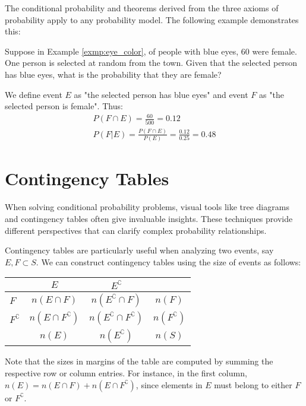 The conditional probability and theorems derived from the three axioms of probability apply to any probability model.
The following example demonstrates this:

\begin{exmp}
	Suppose in Example \autoref{exmp:eye_color}, of people with blue eyes, 60 were female.
	One person is selected at random from the town.
	Given that the selected person has blue eyes, what is the probability that they are female?
\end{exmp}
\begin{solution}
	We define event \( E \) as "the selected person has blue eyes" and event \( F \) as "the selected person is female".
	Thus:
	\begin{gather*}
		P(F \cap E) = \frac{60}{500} = 0.12\\
		P(F | E) = \frac{P(F \cap E)}{P(E)} = \frac{0.12}{0.25} = 0.48
	\end{gather*}
\end{solution}

\section{Contingency Tables}

When solving conditional probability problems, visual tools like tree diagrams and contingency tables often give invaluable insights.
These techniques provide different perspectives that can clarify complex probability relationships.

Contingency tables are particularly useful when analyzing two events, say \( E, F \subset S \).
We can construct contingency tables using the size of events as follows:
\begin{center}
\begin{tabular}{l|cc|c}
                       & \( E \) & \( E^\complement \) &  \\ \hline
\( F \)                & \( n(E \cap F) \) & \( n(E^\complement \cap F) \) & \( n(F) \) \\ 
\( F^\complement \)    & \( n(E \cap F^\complement) \) & \( n(E^\complement \cap F^\complement) \) & \( n(F^\complement) \) \\ \hline
                       & \( n(E) \) & \( n(E^\complement) \) & \( n(S) \)
\end{tabular}
\end{center}
Note that the sizes in margins of the table are computed by summing the respective row or column entries. 
For instance, in the first column, \( n(E) = n(E \cap F) + n(E \cap F^\complement) \),
since elements in \( E \) must belong to either \( F \) or \( F^\complement \).

